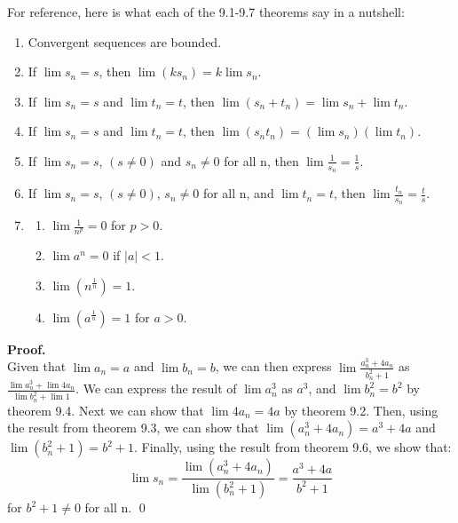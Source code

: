\documentclass[12pt]{article}
\begin{document}
For reference, here is what each of the 9.1-9.7 theorems say in a nutshell:
\begin{center}
\begin{minipage}{0.7\textwidth}
\begin{footnotesize}
\begin{enumerate}[label=9.\arabic* Theorem:]
    \item Convergent sequences are bounded.
    \item If $\lim s_n = s$, then $\lim (ks_n) = k \lim s_n$.
    \item If $\lim s_n = s$ and $\lim t_n = t$, then $\lim (s_n + t_n ) = \lim s_n + \lim t_n$.
    \item If $\lim s_n = s$ and $\lim t_n = t$, then $\lim (s_n t_n) = (\lim s_n)(\lim t_n)$.
    \item If $\lim s_n = s$, $(s \neq 0)$  and $s_n \neq 0$ for all n, then $\lim \frac{1}{s_n}= \frac{1}{s}$.
    \item If $\lim s_n = s$, $(s \neq 0)$, $s_n \neq 0$ for all n, and $\lim t_n = t$, then $\lim \frac{t_n}{s_n}=\frac{t}{s}$.
    \item  
    \begin{enumerate}
        \item $\lim \frac{1}{n^p}=0$ for $p>0$.
        \item $\lim a^n=0$ if $|a|<1$.
        \item $\lim (n^{\frac{1}{n}})=1$.
        \item $\lim (a^{\frac{1}{n}})=1$ for $a > 0$.
    \end{enumerate}
\end{enumerate}
\end{footnotesize}
\end{minipage}
\end{center}
\vspace{0.25em}

\textbf{Proof.}\\
Given that $\lim a_n = a$ and $\lim b_n = b$, we can then express $\lim\frac{a_n^3 + 4a_n}{b_n^2 + 1}$ as $\frac{\lim a_n^3 + \lim 4a_n}{\lim b_n^2 + \lim 1}$. We can express the result of $\lim a_n^3$ as $a^3$, and  $\lim b_n^2=b^2$ by theorem 9.4. Next we can show that $\lim 4a_n = 4a$ by theorem 9.2. Then, using the result from theorem 9.3, we can show that $\lim (a_n^3+4a_n) = a^3+4a$ and $\lim (b_n^2+1) = b^2+1$. Finally, using the result from theorem 9.6, we show that:
\[
\lim s_n = \frac{\lim (a_n^3 + 4a_n)}{\lim (b_n^2 + 1)} = \frac{a^3+4a}{b^2+1}
\]
for $b^2+1 \neq 0$ for all n.
\qed
\end{document}
